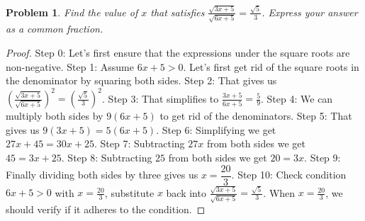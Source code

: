 \documentclass{article}
\newtheorem{theorem}{Problem}
\begin{document}
\begin{theorem}
Find the value of $x$ that satisfies $\frac{\sqrt{3x+5}}{\sqrt{6x+5}}=\frac{\sqrt{5}}{3}$. Express your answer as a common fraction.
\end{theorem}

\begin{proof}
Step 0: Let's first ensure that the expressions under the square roots are non-negative.
Step 1: Assume $6x+5 > 0$. Let's first get rid of the square roots in the denominator by squaring both sides.
Step 2: That gives us $\displaystyle\left(\frac{\sqrt{3x+5}}{\sqrt{6x+5}}\right)^2=\left(\frac{\sqrt{5}}{3}\right)^2$.
Step 3: That simplifies to $\frac{3x+5}{6x+5}=\frac{5}{9}$.
Step 4: We can multiply both sides by $9(6x+5)$ to get rid of the denominators.
Step 5: That gives us $9(3x+5)=5(6x+5)$.
Step 6: Simplifying we get $27x+45=30x+25$.
Step 7: Subtracting $27x$ from both sides we get $45=3x+25$.
Step 8: Subtracting $25$ from both sides we get $20=3x$.
Step 9: Finally dividing both sides by three gives us $x=\dfrac{20}{3}$.
Step 10: Check condition $6x+5 > 0$ with $x=\frac{20}{3}$, substitute $x$ back into $\frac{\sqrt{3x+5}}{\sqrt{6x+5}}=\frac{\sqrt{5}}{3}$. When $x=\frac{20}{3}$, we should verify if it adheres to the condition.
\end{proof}
\end{document}
